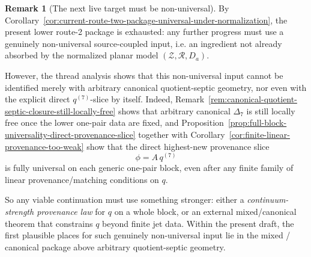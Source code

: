\documentclass[11pt,a4paper]{amsart}
\theoremstyle{plain}
\theoremstyle{definition}
\newtheorem{remark}[theorem]{Remark}
\begin{document}
\begin{remark}[The next live target must be non-universal]
\label{rem:next-live-target-must-be-non-universal}
By
Corollary~\ref{cor:current-route-two-package-universal-under-normalization},
the present lower route-2 package is exhausted: any further progress must use a
genuinely non-universal source-coupled input, i.e. an ingredient not already
absorbed by the normalized planar model $(\mathcal Z,\mathcal R,D_a)$.

However, the thread analysis shows that this non-universal input cannot be
identified merely with arbitrary canonical quotient-septic geometry, nor even
with the explicit direct $q^{(7)}$-slice by itself. Indeed,
Remark~\ref{rem:canonical-quotient-septic-closure-still-locally-free} shows
that arbitrary canonical $\Delta_7$ is still locally free once the lower
one-pair data are fixed, and
Proposition~\ref{prop:full-block-universality-direct-provenance-slice} together
with Corollary~\ref{cor:finite-linear-provenance-too-weak} show that the direct
highest-new provenance slice
\[
\phi=A\,q^{(7)}
\]
is fully universal on each generic one-pair block, even after any finite family
of linear provenance/matching conditions on $q$.

So any viable continuation must use something stronger: either a
\emph{continuum-strength provenance law} for $q$ on a whole block, or an
external mixed/canonical theorem that constrains $q$ beyond finite jet data.
Within the present draft, the first plausible places for such genuinely
non-universal input lie in the mixed / canonical package above arbitrary
quotient-septic geometry.
\end{remark}
\end{document}
